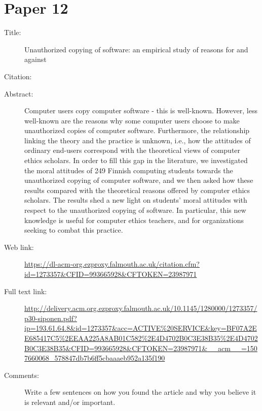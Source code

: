 \documentclass{scrartcl}
\begin{document}
\section*{Paper 12}
\begin{description}
\item[Title:] Unauthorized copying of software: an empirical study of reasons for and against
\item[Citation:] \cite{Unauthorized}
\item[Abstract:] Computer users copy computer software - this is well-known. However, less well-known are the reasons why some computer users choose to make unauthorized copies of computer software. Furthermore, the relationship linking the theory and the practice is unknown, i.e., how the attitudes of ordinary end-users correspond with the theoretical views of computer ethics scholars. In order to fill this gap in the literature, we investigated the moral attitudes of 249 Finnish computing students towards the unauthorized copying of computer software, and we then asked how these results compared with the theoretical reasons offered by computer ethics scholars. The results shed a new light on students' moral attitudes with respect to the unauthorized copying of software. In particular, this new knowledge is useful for computer ethics teachers, and for organizations seeking to combat this practice.
\item[Web link:] \url{https://dl-acm-org.ezproxy.falmouth.ac.uk/citation.cfm?id=1273357&CFID=993665928&CFTOKEN=23987971}
\item[Full text link:] \url{http://delivery.acm.org.ezproxy.falmouth.ac.uk/10.1145/1280000/1273357/p30-siponen.pdf?ip=193.61.64.8&id=1273357&acc=ACTIVE%20SERVICE&key=BF07A2EE685417C5%2EEAA225A8AB01C582%2E4D4702B0C3E38B35%2E4D4702B0C3E38B35&CFID=993665928&CFTOKEN=23987971&__acm__=1507660068_578847db7b6ff5cbaaaeb952a135f190}
\item[Comments:] Write a few sentences on how you found the article and why you believe it is relevant and/or important.
\end{description}



\end{document}
